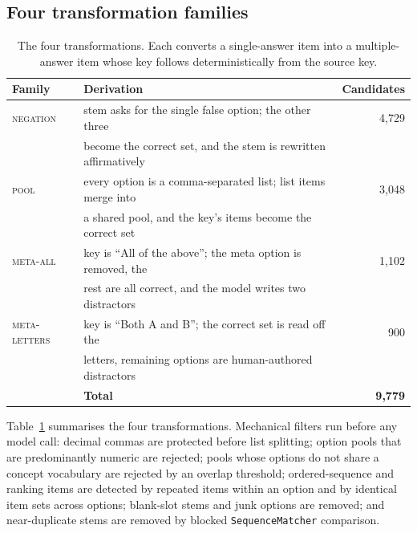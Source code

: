 \documentclass{article} %
\begin{document}
\subsection{Four transformation families}

\begin{table}[t]
\caption{The four transformations. Each converts a single-answer item into a
multiple-answer item whose key follows deterministically from the source key.}
\label{tab:families}
\begin{center}
\begin{small}
\begin{tabular}{llr}
\toprule
\textbf{Family} & \textbf{Derivation} & \textbf{Candidates} \\
\midrule
\textsc{negation} & stem asks for the single false option; the other three & 4,729 \\
                  & become the correct set, and the stem is rewritten affirmatively & \\
\textsc{pool}     & every option is a comma-separated list; list items merge into & 3,048 \\
                  & a shared pool, and the key's items become the correct set & \\
\textsc{meta-all} & key is ``All of the above''; the meta option is removed, the & 1,102 \\
                  & rest are all correct, and the model writes two distractors & \\
\textsc{meta-letters} & key is ``Both A and B''; the correct set is read off the & 900 \\
                  & letters, remaining options are human-authored distractors & \\
\midrule
& \textbf{Total} & \textbf{9,779} \\
\bottomrule
\end{tabular}
\end{small}
\end{center}
\end{table}

Table~\ref{tab:families} summarises the four transformations. Mechanical filters run
before any model call: decimal commas are protected before list splitting; option pools
that are predominantly numeric are rejected; pools whose options do not share a concept
vocabulary are rejected by an overlap threshold; ordered-sequence and ranking items are
detected by repeated items within an option and by identical item sets across options;
blank-slot stems and junk options are removed; and near-duplicate stems are removed by
blocked \texttt{SequenceMatcher} comparison.
\end{document}
